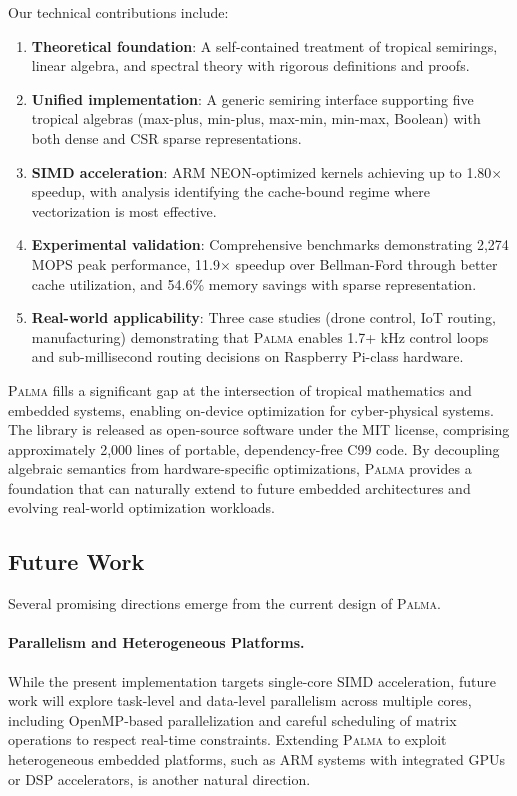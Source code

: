 \documentclass[11pt,a4paper]{article}
\theoremstyle{plain}
\theoremstyle{definition}
\newcommand{\palma}{\textsc{Palma}}
\begin{document}
Our technical contributions include:

\begin{enumerate}
    \item \textbf{Theoretical foundation}: A self-contained treatment of tropical semirings, linear algebra, and spectral theory with rigorous definitions and proofs.
    
    \item \textbf{Unified implementation}: A generic semiring interface supporting five tropical algebras (max-plus, min-plus, max-min, min-max, Boolean) with both dense and CSR sparse representations.
    
    \item \textbf{SIMD acceleration}: ARM NEON-optimized kernels achieving up to 1.80$\times$ speedup, with analysis identifying the cache-bound regime where vectorization is most effective.
    
    \item \textbf{Experimental validation}: Comprehensive benchmarks demonstrating 2,274 MOPS peak performance, 11.9$\times$ speedup over Bellman-Ford through better cache utilization, and 54.6\% memory savings with sparse representation.
    
    \item \textbf{Real-world applicability}: Three case studies (drone control, IoT routing, manufacturing) demonstrating that \palma{} enables 1.7+ kHz control loops and sub-millisecond routing decisions on Raspberry Pi-class hardware.
\end{enumerate}

\palma{} fills a significant gap at the intersection of tropical mathematics and embedded systems, enabling on-device optimization for cyber-physical systems. The library is released as open-source software under the MIT license, comprising approximately 2,000 lines of portable, dependency-free C99 code. By decoupling algebraic semantics from hardware-specific optimizations, \palma{} provides a foundation that can naturally extend to future embedded architectures and evolving real-world optimization workloads.

\subsection{Future Work}

Several promising directions emerge from the current design of \palma{}.

\paragraph{Parallelism and Heterogeneous Platforms.}
While the present implementation targets single-core SIMD acceleration, future work will explore task-level and data-level parallelism across multiple cores, including OpenMP-based parallelization and careful scheduling of matrix operations to respect real-time constraints. Extending \palma{} to exploit heterogeneous embedded platforms, such as ARM systems with integrated GPUs or DSP accelerators, is another natural direction.
\end{document}
